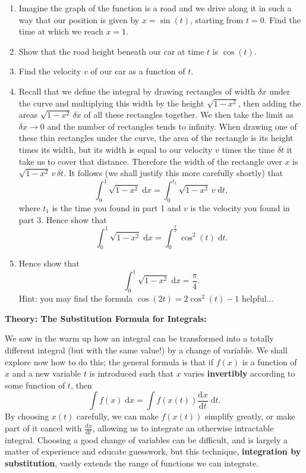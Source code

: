 \documentclass{article}
\newcommand{\deriv}[3][]{\frac{\mathrm{d}^{#1}#2}{\mathrm{d}#3^{#1}}}
\newcommand{\diff}{\;\mathrm{d}}
\begin{document}
\begin{enumerate}
	\item Imagine the graph of the function is a road and we drive along it in such a way that our position is given by $x=\sin(t)$, starting from $t=0$. Find the time at which we reach $x=1$.
	\item Show that the road height beneath our car at time $t$ is $\cos(t)$.
	\item Find the velocity $v$ of our car as a function of $t$.
	\item Recall that we define the integral by drawing rectangles of width $\delta x$ under the curve and multiplying this width by the height $\sqrt{1-x^2}$, then adding the areas $\sqrt{1-x^2}\,\delta x$ of all these rectangles together. We then take the limit as $\delta x\to 0$ and the number of rectangles tends to infinity. When drawing one of these thin rectangles under the curve, the area of the rectangle is its height times its width, but its width is equal to our velocity $v$ times the time $\delta t$ it take us to cover that distance. Therefore the width of the rectangle over $x$ is $\sqrt{1-x^2}\,v\,\delta t$. It follows (we shall justify this more carefully shortly) that
		\[\int_0^1 \sqrt{1-x^2}\diff x = \int_{0}^{t_1} \sqrt{1-x^2}\,v\diff t,\]
		where $t_1$ is the time you found in part 1 and $v$ is the velocity you found in part 3. Hence show that
		\[\int_0^1 \sqrt{1-x^2}\diff x = \int_{0}^{\frac{\pi}{2}} \cos^2(t)\diff t.\]
	\item Hence show that
		\[\int_0^1\sqrt{1-x^2}\diff x = \frac{\pi}{4}.\]
		Hint: you may find the formula $\cos(2t)=2\cos^2(t)-1$ helpful...
\end{enumerate}



\clearpage


\textbf{Theory: The Substitution Formula for Integrals:}

\bigskip


We saw in the warm up how an integral can be transformed into a totally different integral (but with the same value!) by a change of variable. We shall explore now how to do this; the general formula is that if $f(x)$ is a function of $x$ and a new variable $t$ is introduced such that $x$ varies \textbf{invertibly} according to some function of $t$, then
\[\int f(x)\diff x = \int f(x(t))\deriv{x}{t}\diff t.\]
By choosing $x(t)$ carefully, we can make $f(x(t))$ simplify greatly, or make part of it cancel with $\deriv{x}{t}$, allowing us to integrate an otherwise intractable integral. Choosing a good change of variables can be difficult, and is largely a matter of experience and educate guesswork, but this technique, \textbf{integration by substitution}, vastly extends the range of functions we can integrate.\bigskip
\end{document}
